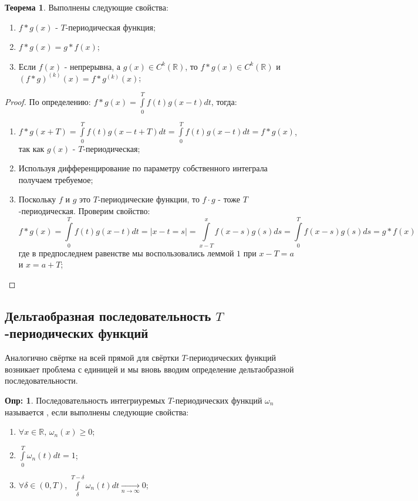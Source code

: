 \documentclass[12pt]{article}
\newcommand{\MR}{\mathbb{R}}
\theoremstyle{definition}
\newtheorem{defn}{Опр:}
\newtheorem{theorem}{Теорема}
\newcommand{\ddint}[2]{\displaystyle\int\limits_{#1}^{#2}}
\begin{document}
\begin{theorem} Выполнены следующие свойства:
	\begin{enumerate}[label=\arabic*)]
		\item $f*g(x)$ - $T$-периодическая функция;
		\item $f*g(x) = g*f(x)$;
		\item Если $f(x)$ - непрерывна, а $g(x) \in C^k(\MR)$, то $f*g(x) \in C^k(\MR)$ и $(f*g)^{(k)}(x) = f*g^{(k)}(x)$;
	\end{enumerate}
\end{theorem}
\begin{proof}
	По определению: $f*g(x) = \ddint{0}{T}f(t)g(x - t)dt$, тогда:
	\begin{enumerate}[label=\arabic*)]
		\item $f*g(x + T) = \ddint{0}{T}f(t)g(x - t + T)dt = \ddint{0}{T}f(t)g(x - t )dt = f*g(x)$, так как $g(x)$ - $T$-периодическая;
		\setcounter{enumi}{2}
		\item Используя дифференцирование по параметру собственного интеграла получаем требуемое;
		\setcounter{enumi}{1}
		\item Поскольку $f$ и $g$ это $T$-периодические функции, то $f{\cdot}g$ - тоже $T$-периодическая. Проверим свойство:
		$$
			f*g(x) = \ddint{0}{T}f(t)g(x-t)dt = |x -t = s| =  \ddint{x- T}{x}f(x-s)g(s)ds = \ddint{0}{T}f(x-s)g(s)ds = g*f(x)
		$$
		где в предпоследнем равенстве мы воспользовались леммой $1$ при $x - T = a$ и $x = a + T$;
	\end{enumerate}
\end{proof}

\newpage
\subsection*{Дельтаобразная последовательность $T$-периодических функций}
Аналогично свёртке на всей прямой для свёртки $T$-периодических функций возникает проблема с единицей и мы вновь вводим определение дельтаобразной последовательности.
\begin{defn}
	Последовательность интегриуремых $T$-периодических функций $\omega_n$ называется , если выполнены следующие свойства:
	\begin{enumerate}[label=\arabic*)]
		\item $\forall x \in \MR, \, \omega_n(x) \geq 0$;
		\item $\ddint{0}{T}\omega_n(t)dt = 1$;
		\item $\forall \delta \in (0,T), \, \ddint{\delta}{T - \delta}\omega_n(t)dt \xrightarrow[n \to \infty]{} 0$;
	\end{enumerate}
\end{defn}
\end{document}
